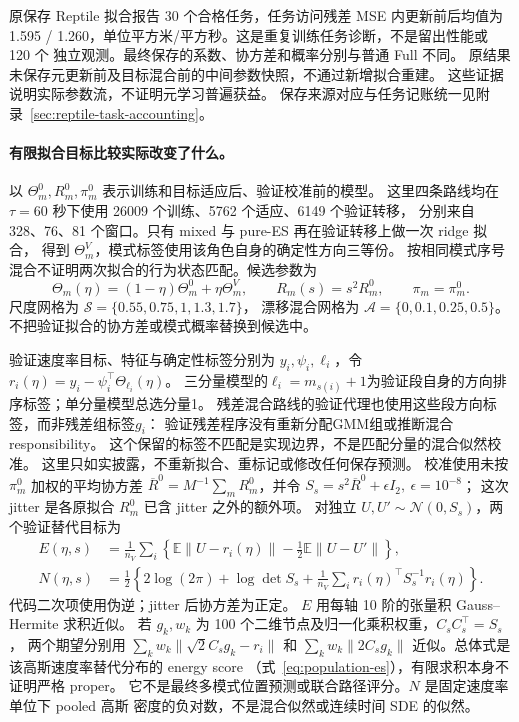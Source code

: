 \documentclass[UTF8,11pt]{ctexart}
\begin{document}
原保存 Reptile 拟合报告 30 个合格任务，任务访问残差 MSE 内更新前后均值为
1.595 / 1.260，单位平方米/平方秒。这是重复训练任务诊断，不是留出性能或 120 个
独立观测。最终保存的系数、协方差和概率分别与普通 Full 不同。
原结果未保存元更新前及目标混合前的中间参数快照，不通过新增拟合重建。
这些证据说明实际参数流，不证明元学习普遍获益。
保存来源对应与任务记账统一见附录~\ref{sec:reptile-task-accounting}。

\paragraph{有限拟合目标比较实际改变了什么。}
\label{sec:estimator-calibration}
以 \(\Theta_m^0,R_m^0,\pi_m^0\) 表示训练和目标适应后、验证校准前的模型。
这里四条路线均在 \(\tau=60\) 秒下使用 26009 个训练、5762 个适应、6149 个验证转移，
分别来自 328、76、81 个窗口。只有 mixed 与 pure-ES 再在验证转移上做一次 ridge 拟合，
得到 \(\Theta_m^V\)，模式标签使用该角色自身的确定性方向三等份。
按相同模式序号混合不证明两次拟合的行为状态匹配。候选参数为
\begin{equation}
\Theta_m(\eta)=(1-\eta)\Theta_m^0+\eta\Theta_m^V,\qquad
R_m(s)=s^2R_m^0,\qquad \pi_m=\pi_m^0 .
\label{eq:estimator-drift-grid}
\end{equation}
尺度网格为 \(\mathcal S=\{0.55,0.75,1,1.3,1.7\}\)，
漂移混合网格为 \(\mathcal A=\{0,0.1,0.25,0.5\}\)。
不把验证拟合的协方差或模式概率替换到候选中。

验证速度率目标、特征与确定性标签分别为 \(y_i,\psi_i,\ell_i\)，令
\(r_i(\eta)=y_i-\psi_i^\top\Theta_{\ell_i}(\eta)\)。
三分量模型的\(\ell_i=m_{s(i)}+1\)为验证段自身的方向排序标签；单分量模型总选分量1。
残差混合路线的验证代理也使用这些段方向标签，而非残差组标签\(g_i\)：
验证残差程序没有重新分配GMM组或推断混合responsibility。
这个保留的标签不匹配是实现边界，不是匹配分量的混合似然校准。
这里只如实披露，不重新拟合、重标记或修改任何保存预测。
校准使用未按 \(\pi_m^0\) 加权的平均协方差
\(\overline R^0=M^{-1}\sum_mR_m^0\)，并令
\(S_s=s^2\overline R^0+\epsilon I_2,\ \epsilon=10^{-8}\)；
这次 jitter 是各原拟合 \(R_m^0\) 已含 jitter 之外的额外项。
对独立 \(U,U'\sim\mathcal N(0,S_s)\)，两个验证替代目标为
\begin{equation}
\begin{aligned}
E(\eta,s)&=\frac1{n_V}\sum_i
 \left\{\mathbb E\|U-r_i(\eta)\|-\tfrac12\mathbb E\|U-U'\|\right\},\\
N(\eta,s)&=\tfrac12\left\{2\log(2\pi)+\log\det S_s
 +\frac1{n_V}\sum_i r_i(\eta)^\top S_s^{-1}r_i(\eta)\right\}.
\end{aligned}
\label{eq:estimator-validation-surrogates}
\end{equation}
代码二次项使用伪逆；jitter 后协方差为正定。
\(E\) 用每轴 10 阶的张量积 Gauss--Hermite 求积近似。
若 \(g_k,w_k\) 为 100 个二维节点及归一化乘积权重，\(C_sC_s^\top=S_s\)，
两个期望分别用 \(\sum_kw_k\|\sqrt2C_sg_k-r_i\|\) 和
\(\sum_kw_k\|2C_sg_k\|\) 近似。总体式是该高斯速度率替代分布的 energy score
（式~\eqref{eq:population-es}），有限求积本身不证明严格 proper。
它不是最终多模式位置预测或联合路径评分。\(N\) 是固定速度率单位下 pooled 高斯
密度的负对数，不是混合似然或连续时间 SDE 的似然。
\end{document}
